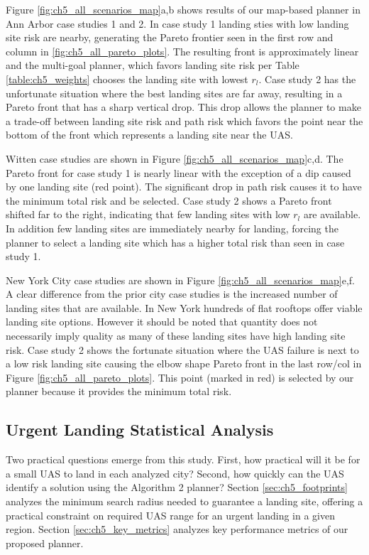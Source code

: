 Figure \ref{fig:ch5_all_scenarios_map}a,b shows results of our map-based planner in Ann Arbor case studies 1 and 2. In case study 1 landing sties with low landing site risk are nearby, generating the Pareto frontier seen in the first row and column in \ref{fig:ch5_all_pareto_plots}. The resulting front is approximately linear and the multi-goal planner, which favors landing site risk per Table \ref{table:ch5_weights} chooses the landing site with lowest $r_l$. Case study 2 has the unfortunate situation where the best landing sites are far away, resulting in a Pareto front that has a sharp vertical drop. This drop allows the planner to make a trade-off between landing site risk and path risk which favors the point near the bottom of the front which represents a landing site near the UAS.

Witten case studies are shown in Figure \ref{fig:ch5_all_scenarios_map}c,d.   The Pareto front for case study 1 is nearly linear with the exception of a dip caused by one landing site (red point). The significant drop in path risk causes it to have the minimum total risk and be selected. Case study 2 shows a Pareto front shifted far to the right, indicating that few landing sites with low $r_l$ are available. In addition few landing sites are immediately nearby for landing, forcing the planner to select a landing site which has a higher total risk than seen in case study 1.

New York City case studies are shown in Figure \ref{fig:ch5_all_scenarios_map}e,f. A clear difference from the prior city case studies is the increased number of landing sites that are available. In New York hundreds of flat rooftops offer viable landing site options. However it should be noted that quantity does not necessarily imply quality as many of these landing sites have high landing site risk. Case study 2 shows the fortunate situation where the \ac{UAS} failure is next to a low risk landing site causing the elbow shape Pareto front in the last row/col in Figure \ref{fig:ch5_all_pareto_plots}. This point (marked in red) is selected by our planner because it provides the minimum total risk.





\subsection{Urgent Landing Statistical Analysis}\label{sec:ch5_meta_analysis}

Two practical questions emerge from this study.  First, how practical will it be for a small \ac{UAS} to land in each analyzed city?  Second, how quickly can the \ac{UAS} identify a solution using the Algorithm 2 planner?  Section \ref{sec:ch5_footprints} analyzes the minimum search radius needed to guarantee a landing site, offering a practical constraint on required \ac{UAS} range for an urgent landing in a given region. Section \ref{sec:ch5_key_metrics} analyzes key performance metrics of our proposed planner.


